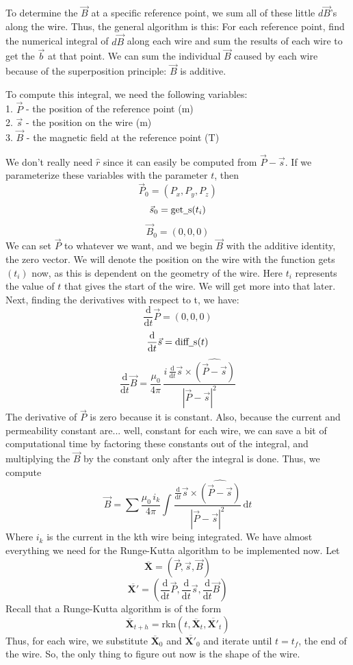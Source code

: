 \documentclass[12pt]{article}
\newcommand{\bfvec}[1]{\overline{\mathbf{#1}}}
\newcommand{\spaces}{\phantom{\qquad}}
\newcommand{\under}{\underline{\phantom{\enspace}}}
\newcommand{\diff}{\frac{\mathrm{d}}{\mathrm{d}t}}
\newcommand{\dif}{\mathrm{d}}
\begin{document}
	To determine the $\vec{B}$ at a specific reference point, we sum all of these little $d\vec{B}$'s along the wire. Thus, the general algorithm is this: For each reference point, find the numerical integral of $d\vec{B}$ along each wire and sum the results of each wire to get the $\vec{b}$ at that point. We can sum the individual $\vec{B}$ caused by each wire because of the superposition principle: $\vec{B}$ is additive.
	
	To compute this integral, we need the following variables: \\
		\spaces 1. $\vec{P}$ - the position of the reference point (m)\\
		\spaces 2. $\vec{s}$ - the position on the wire (m)\\
		\spaces 3. $\vec{B}$ - the magnetic field at the reference point (T)
		
	We don't really need $\hat{r}$ since it can easily be computed from $\vec{P} - \vec{s}$. If we parameterize these variables with the parameter $t$, then
			$$\vec{P}_0 = (P_x, P_y, P_z)$$
			$$\vec{s}_0 = \text{get\under s}(t_i)$$
			$$\vec{B}_0 = (0, 0, 0)$$
	We can set $\vec{P}$ to whatever we want, and we begin $\vec{B}$ with the additive identity, the zero vector. We will denote the position on the wire with the function get\under s$(t_i)$ now, as this is dependent on the geometry of the wire. Here $t_i$ represents the value of $t$ that gives the start of the wire. We will get more into that later. Next, finding the derivatives with respect to t, we have:
			$$\diff \vec{P} = (0, 0, 0)$$
			$$\diff \vec{s} = \text{diff\under s}(t)$$
			$$\diff \vec{B} = \frac{\mu_0}{4\pi} \, \frac{i\,\diff \vec{s} \times \widehat{(\vec{P} - \vec{s})}}{|\vec{P} - \vec{s}|^2}$$	
	The derivative of $\vec{P}$ is zero because it is constant. Also, because the current and permeability constant are... well, constant for each wire, we can save a bit of computational time by factoring these constants out of the integral, and multiplying the $\vec{B}$ by the constant only after the integral is done. Thus, we compute
			$$\vec{B} = \sum \frac{\mu_0 \, i_k}{4\pi}\int\frac{\diff \vec{s} \times \widehat{(\vec{P} - \vec{s})}}{|\vec{P} - \vec{s}|^2} \, \dif t$$	
	Where $i_k$ is the current in the kth wire being integrated. We have almost everything we need for the Runge-Kutta algorithm to be implemented now. Let
			$$\bfvec{X} = (\vec{P},\vec{s},\vec{B})$$
			$$\bfvec{X'} = \left(\diff\vec{P},\diff\vec{s},\diff\vec{B}\right)$$
	Recall that a Runge-Kutta algorithm is of the form
			$$\bfvec{X}_{t+h} = \mathrm{rkn}(t,\bfvec{X}_t,\bfvec{X'}_t)$$
	Thus, for each wire, we substitute $\bfvec{X}_0$ and $\bfvec{X'}_0$ and iterate until $t = t_f$, the end of the wire. So, the only thing to figure out now is the shape of the wire. 
	
\end{document}

